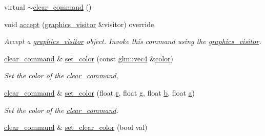 \begin{DoxyCompactItemize}
\item 
virtual \mbox{\hyperlink{classmoka_1_1clear__command_a08e1abf9988fdabf7e9f85705614fbd4}{$\sim$clear\+\_\+command}} ()
\item 
void \mbox{\hyperlink{classmoka_1_1clear__command_a321fa172131c9219f1a8a57e228215fb}{accept}} (\mbox{\hyperlink{classmoka_1_1graphics__visitor}{graphics\+\_\+visitor}} \&visitor) override
\begin{DoxyCompactList}\small\item\em Accept a \mbox{\hyperlink{classmoka_1_1graphics__visitor}{graphics\+\_\+visitor}} object. Invoke this command using the \mbox{\hyperlink{classmoka_1_1graphics__visitor}{graphics\+\_\+visitor}}. \end{DoxyCompactList}\item 
\mbox{\hyperlink{classmoka_1_1clear__command}{clear\+\_\+command}} \& \mbox{\hyperlink{classmoka_1_1clear__command_a444e7779e89f6818d99be5a5ec901dc1}{set\+\_\+color}} (const \mbox{\hyperlink{namespacemoka_aed2224bc0e5b79e57a8975ded94ee1aaa1a9028fd802c481a99491a418ca2fe86}{glm\+::vec4}} \&\mbox{\hyperlink{namespacemoka_a8fbd522082ce6449bc1e307f785aafe5}{color}})
\begin{DoxyCompactList}\small\item\em Set the color of the \mbox{\hyperlink{classmoka_1_1clear__command}{clear\+\_\+command}}. \end{DoxyCompactList}\item 
\mbox{\hyperlink{classmoka_1_1clear__command}{clear\+\_\+command}} \& \mbox{\hyperlink{classmoka_1_1clear__command_a3a7771ccad1fda309a857617687d81a6}{set\+\_\+color}} (float \mbox{\hyperlink{namespacemoka_a1989c05aecf3bb10bbf8a7027e3df130a4b43b0aee35624cd95b910189b3dc231}{r}}, float \mbox{\hyperlink{namespacemoka_a45a36b05a9b9eddb028d6c60305ae71dab2f5ff47436671b6e533d8dc3614845d}{g}}, float \mbox{\hyperlink{namespacemoka_a45a36b05a9b9eddb028d6c60305ae71da92eb5ffee6ae2fec3ad71c777531578f}{b}}, float \mbox{\hyperlink{namespacemoka_a45a36b05a9b9eddb028d6c60305ae71da0cc175b9c0f1b6a831c399e269772661}{a}})
\begin{DoxyCompactList}\small\item\em Set the color of the \mbox{\hyperlink{classmoka_1_1clear__command}{clear\+\_\+command}}. \end{DoxyCompactList}\item 
\mbox{\hyperlink{classmoka_1_1clear__command}{clear\+\_\+command}} \& \mbox{\hyperlink{classmoka_1_1clear__command_a0dab48e1983dbafdacb2d06d68fdfc92}{set\+\_\+clear\+\_\+color}} (bool val)

\end{DoxyCompactItemize}

